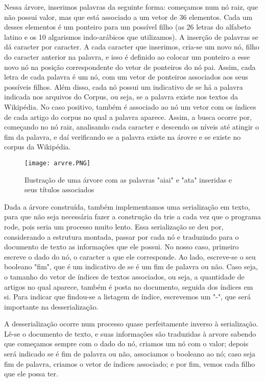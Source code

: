 \documentclass{article}
\begin{document}
Nessa árvore, inserimos palavras da seguinte forma: começamos num nó raiz, que não possui valor, mas que está associado a um vetor de 36 elementos. Cada um desses elementos é um ponteiro para um possível filho (as 26 letras do alfabeto latino e os 10 algarismos indo-arábicos que utilizamos). A inserção de palavras se dá caracter por caracter. A cada caracter que inserimos, cria-se um novo nó, filho do caracter anterior na palavra, e isso é definido ao colocar um ponteiro a esse novo nó na posição correspondente do vetor de ponteiros do nó pai. Assim, cada letra de cada palavra é um nó, com um vetor de ponteiros associados aos seus possíveis filhos. Além disso, cada nó possui um indicativo de se há a palavra indicada nos arquivos do Corpus, ou seja, se a palavra existe nos textos da Wikipédia. No caso positivo, também é associado ao nó um vetor com os índices de cada artigo do corpus no qual a palavra aparece. Assim, a busca ocorre por, começando no nó raiz, analisando cada caracter e descendo os níveis até atingir o fim da palavra, e daí verificando se a palavra existe na árovre e se existe no corpus da Wikipédia.
\begin{figure}[h!]
    \centering
    \texttt{[image: arvre.PNG]}
    \caption{Ilustração de uma árvore com as palavras "aiai" e "ata" inseridas e seus títulos associados}
    \label{fig:arvre}
\end{figure}



Dada a árvore construída, também implementamos uma serialização em texto, para que não seja necessária fazer a construção da trie a cada vez que o programa rode, pois seria um processo muito lento. Essa serialização se deu por, considerando a estrutura montada, passar por cada nó e traduzindo para o documento de texto as informações que ele possui. No nosso caso, primeiro escreve o dado do nó, o caracter a que ele corresponde. Ao lado, escreve-se o seu booleano "fim", que é um indicativo de se é um fim de palavra ou não. Caso seja, o tamanho do vetor de índices de textos associados, ou seja, a quantidade de artigos no qual aparece, também é posta no documento, seguida dos índices em si. Para indicar que findou-se a listagem de índice, escrevemos um "-", que será importante na desserialização.

A desserialização ocorre num processo quase perfeitamente inverso à serialização. Lê-se o documento de texto, e suas informações são traduzidas à arvore sabendo que começamos sempre com o dado do nó, criamos um nó com o valor; depois será indicado se é fim de palavra ou não, associamos o booleano ao nó; caso seja fim de palavra, criamos o vetor de índices associado; e por fim, vemos cada filho que ele possa ter.
\end{document}

